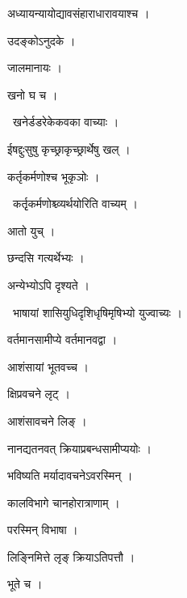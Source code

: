 \documentclass[10pt, openany, oneside]{book}
\begin{document}
\noindent अध्यायन्यायोद्यावसंहाराधारावयाश्च ।

\noindent उदङ्कोऽनुदके ।

\noindent जालमानायः ।

\noindent खनो घ च ।

\par\noindent\hspace{1.5em}{\vps वा॰}~{\qt खनेर्डडरेकेकवका वाच्याः ।}

\noindent ईषद्दुःसुषु कृच्छ्राकृच्छ्रार्थेषु खल् ।

\noindent कर्तृकर्मणोश्च भूकृञोः ।

\par\noindent\hspace{1.5em}{\vps वा॰}~{\qt कर्तृृकर्मणोश्च्व्यर्थयोरिति वाच्यम् ।}

\noindent आतो युच् ।

\noindent छन्दसि गत्यर्थेभ्यः ।

\noindent अन्येभ्योऽपि दृश्यते ।

\par\noindent\hspace{1.5em}{\vps वा॰}~{\qt भाषायां शासियुधिदृशिधृषिमृषिभ्यो युज्वाच्यः ।}

\noindent वर्तमानसामीप्ये वर्तमानवद्वा ।

\noindent आशंसायां भूतवच्च ।

\noindent क्षिप्रवचने लृट् ।

\noindent आशंसावचने लिङ् ।

\noindent नानद्यतनवत् क्रियाप्रबन्धसामीप्ययोः ।

\noindent भविष्यति मर्यादावचनेऽवरस्मिन् ।

\noindent कालविभागे चानहोरात्राणाम् ।

\noindent परस्मिन् विभाषा ।

\noindent लिङ्निमित्ते लृङ् क्रियाऽतिपत्तौ ।

\noindent भूते च ।
\end{document}
